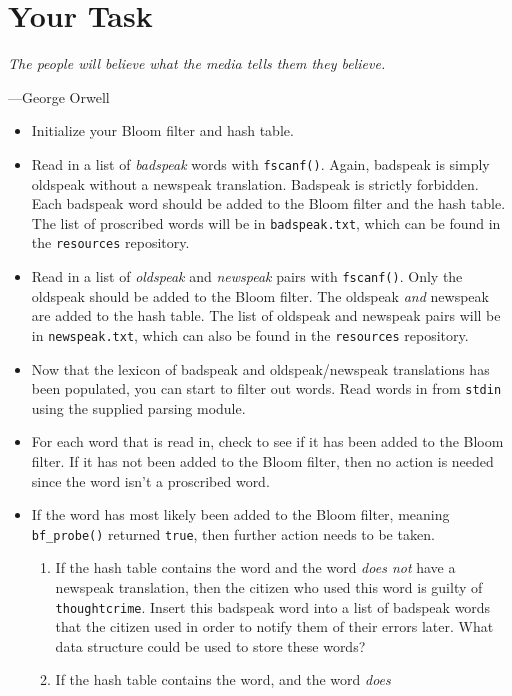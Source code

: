 \section{Your Task}

\textwidth
\epigraph{\emph{The people will believe what the media tells them they
believe.}}{---George Orwell}

\noindent
\begin{itemize}
  \item Initialize your Bloom filter and hash table.
  \item Read in a list of \emph{badspeak} words with \texttt{fscanf()}.
    Again, badspeak is simply oldspeak without a newspeak translation.
    Badspeak is strictly forbidden. Each badspeak word should be added
    to the Bloom filter and the hash table. The list of proscribed words
    will be in \texttt{badspeak.txt}, which can be found in the
    \texttt{resources} repository.
  \item Read in a list of \emph{oldspeak} and \emph{newspeak} pairs with
    \texttt{fscanf()}. Only the oldspeak should be added to the Bloom
    filter. The oldspeak \emph{and} newspeak are added to the hash
    table. The list of oldspeak and newspeak pairs will be in
    \texttt{newspeak.txt}, which can also be found in the
    \texttt{resources} repository.
  \item Now that the lexicon of badspeak and oldspeak/newspeak
    translations has been populated, you can start to filter out words.
    Read words in from \texttt{stdin} using the supplied parsing module.
  \item For each word that is read in, check to see if it has been added
    to the Bloom filter. If it has not been added to the Bloom filter,
    then no action is needed since the word isn't a proscribed word.
  \item If the word has most likely been added to the Bloom filter,
    meaning \texttt{bf\_probe()} returned \texttt{true}, then further
    action needs to be taken.
    \begin{enumerate}
      \item If the hash table contains the word and the word \emph{does
        not} have a newspeak translation, then the citizen who used this
        word is guilty of \texttt{thoughtcrime}. Insert this badspeak
        word into a list of badspeak words that the citizen used in
        order to notify them of their errors later. What data structure
        could be used to store these words?
      \item If the hash table contains the word, and the word \emph{does}

\end{enumerate}
\end{itemize}

